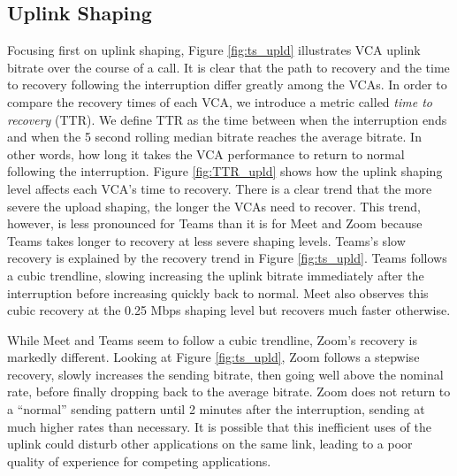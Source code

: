 \subsection{Uplink Shaping}
Focusing first on uplink shaping, Figure \ref{fig:ts_upld} illustrates VCA uplink bitrate over the course of a call. It is clear that the path to recovery and the time to recovery following the interruption differ greatly among the VCAs. In order to compare the recovery times of each VCA, we introduce a metric called \textit{time to recovery} (TTR). We define TTR as the time between when the interruption ends and when the 5 second rolling median bitrate reaches the average bitrate. In other words, how long it takes the VCA performance to return to normal following the interruption. Figure \ref{fig:TTR_upld} shows how the uplink shaping level affects each VCA's time to recovery. There is a clear trend that the more severe the upload shaping, the longer the VCAs need to recover. This trend, however, is less pronounced for Teams than it is for Meet and Zoom because Teams takes longer to recovery at less severe shaping levels. Teams's slow recovery is explained by the recovery trend in Figure \ref{fig:ts_upld}. Teams follows a cubic trendline, slowing increasing the uplink bitrate immediately after the interruption before increasing quickly back to normal. Meet also observes this cubic recovery at the 0.25 Mbps shaping level but recovers much faster otherwise. 

While Meet and Teams seem to follow a cubic trendline, Zoom's recovery is markedly different. Looking at Figure \ref{fig:ts_upld}, Zoom follows a stepwise recovery, slowly increases the sending bitrate, then going well above the nominal rate, before finally dropping back to the average bitrate. Zoom does not return to a ``normal'' sending pattern until 2 minutes after the interruption, sending at much higher rates than necessary. It is possible that this inefficient uses of the uplink could disturb other applications on the same link, leading to a poor quality of experience for competing applications. 

